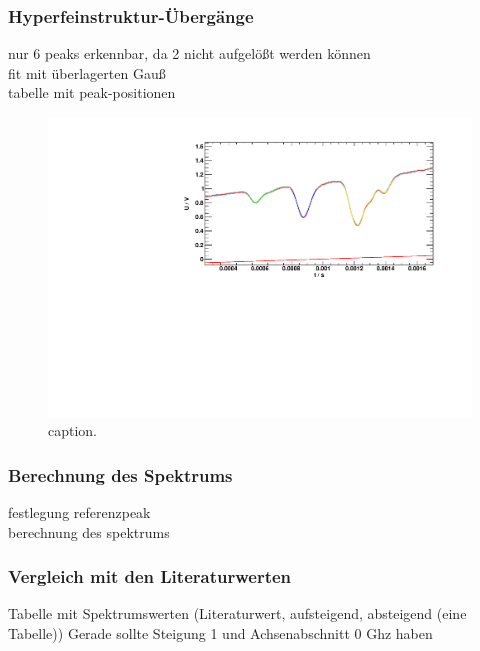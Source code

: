 \subsubsection*{Hyperfeinstruktur-Übergänge}
nur 6 peaks erkennbar, da 2 nicht aufgelößt werden können \\
fit mit überlagerten Gauß \\
tabelle mit peak-positionen
\begin{figure}[H]
\begin{center}
  \includegraphics[width=\textwidth]{../img/part2/up-hfs_zoom_fit.pdf}  %
  \caption{caption.}
  \label{img:hfs:fit:up}
\end{center}
\end{figure}

\subsubsection*{Berechnung des Spektrums}
festlegung referenzpeak \\
berechnung des spektrums 

\subsubsection*{Vergleich mit den Literaturwerten}
Tabelle mit Spektrumswerten (Literaturwert, aufsteigend, absteigend (eine Tabelle))
Gerade sollte Steigung 1 und Achsenabschnitt 0 Ghz haben

